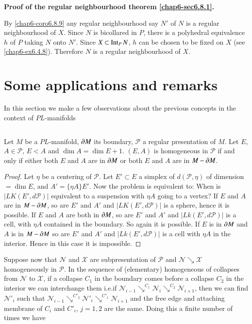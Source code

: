 \noindent
{\bf Proof of the regular neighbourhood theorem \ref{chap6-sec6.8.1}.}

By \ref{chap6-coro6.8.9} any regular neighbourhood say $N'$ of $N$ is a regular neighbourhood of $X$. Since $N$ is bicollared in $P$, there is a polyhedral equivalence $h$ of $P$ taking $N$ onto $N'$. Since $X\subset \operatorname{Int}_{P}N$, $h$ can be chosen to be fixed on $X$ (see \ref{chap6-ex6.4.8}). Therefore $N$ is a regular neighbourhood of $X$.

\section{Some applications and remarks}\pageoriginale\label{chap6-sec6.9}

In this section we make a few observations about the previous concepts in the context of $PL$-manifolds

\subsection{}\label{chap6-sec6.9.1}
Let $M$ be a $PL$-manifold, $\partial M$ its boundary, $\mathscr{P}$ a regular presentation of $M$. Let $E$, $A\in \mathscr{P}$, $E<A$ and $\dim A=\dim E+1$. $(E,A)$ is homogeneous in $\mathscr{P}$ if and only if either both $E$ and $A$ are in $\partial M$ or both $E$ and $A$ are in $M-\partial M$.

\begin{proof}
Let $\eta$ be a centering of $\mathscr{P}$. Let $E'\subset E$ a simplex of $d(\mathscr{P},\eta)$ of dimension $=\dim E$, and $A'=\{\eta A\}E'$. Now the problem is equivalent to: When is $|LK(E',d\mathscr{P})|$ equivalent to a suspension with $\eta A$ going to a vertex? If $E$ and $A$ are in $M-\partial M$, so are $E'$ and $A'$ and $|LK(E',d\mathscr{P})|$ is a sphere, hence it is possible. If $E$ and $A$ are both in $\partial M$, so are $E'$ and $A'$ and $|Lk(E',d\mathscr{P})|$ is a cell, with $\eta A$ contained in the boundary. So again it is possible. If $E$ is in $\partial M$ and $A$ is in $M-\partial M$ so are $E'$ and $A'$ and $|Lk(E',d\mathscr{P})|$ is a cell with $\eta A$ in the interior. Hence in this case it is impossible.
\end{proof}

Suppose now that $\mathscr{N}$ and $\mathscr{X}$ are subpresentation of $\mathscr{P}$ and $\mathscr{N}\searrow \mathscr{X}$ homogeneously in $\mathscr{P}$. In the sequence of (elementary) homogeneous of collapses from $\mathscr{N}$ to $\mathscr{X}$, if a collapse $C_{1}$ in the boundary comes before a collapse $C_{2}$ in the interior we can interchange them i.e.\@ if $\mathscr{N}_{i-1}\searrow^{C_{1}}\mathscr{N}_{i}\searrow^{C_{2}}\mathscr{N}_{i+1}$, then we can find $\mathscr{N}'_{i}$ such that $\mathscr{N}_{i-1}\searrow^{C'_{2}}\mathscr{N}'_{i}\searrow^{C'_{1}}\mathscr{N}_{i+1}$ and the free edge and attaching membrane of $C_{i}$ and $C'_{i}$, $j=1,2$ are the same. Doing this a finite number of times we have

